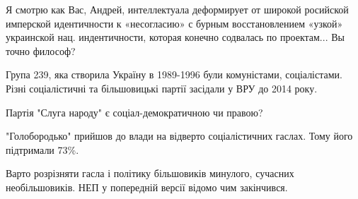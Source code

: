 \begin{itemize}

Я смотрю как Вас, Андрей, интеллектуала деформирует от широкой росийской
имперской идентичности к «несогласию» с бурным восстановлением «узкой»
украинской нац. индентичности, которая конечно содвалась по проектам... Вы точно
философ?


Група 239, яка створила Україну в 1989-1996 були комуністами, соціалістами.
Різні соціалістичні та більшовицькі партії засідали у ВРУ до 2014 року.

Партія "Слуга народу" є соціал-демократичною чи правою?

"Голобородько" прийшов до влади на відверто соціалістичних гаслах. Тому його
підтримали 73\%.

Варто розрізняти гасла і політику більшовиків минулого, сучасних
необільшовиків. НЕП у попередній версії відомо чим закінчився.



\end{itemize} %
